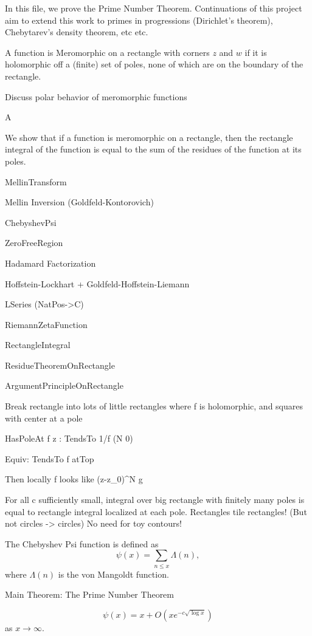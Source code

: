 

In this file, we prove the Prime Number Theorem. Continuations of this project aim to extend
this work to primes in progressions (Dirichlet's theorem), Chebytarev's density theorem, etc
etc.




A function is Meromorphic on a rectangle with corners $z$ and $w$ if it is holomorphic off a
(finite) set of poles, none of which are on the boundary of the rectangle.



Discuss polar behavior of meromorphic functions

A




We show that if a function is meromorphic on a rectangle, then the rectangle integral of the
function is equal to the sum of the residues of the function at its poles.



MellinTransform

Mellin Inversion (Goldfeld-Kontorovich)

ChebyshevPsi

ZeroFreeRegion

Hadamard Factorization

Hoffstein-Lockhart + Goldfeld-Hoffstein-Liemann

LSeries (NatPos->C)

RiemannZetaFunction

RectangleIntegral

ResidueTheoremOnRectangle

ArgumentPrincipleOnRectangle

Break rectangle into lots of little rectangles where f is holomorphic, and squares with center at a pole

HasPoleAt f z : TendsTo 1/f (N 0)

Equiv: TendsTo f atTop

Then locally f looks like (z-z_0)^N g

For all c sufficiently small, integral over big rectangle with finitely many poles is equal to rectangle integral localized at each pole.
Rectangles tile rectangles! (But not circles -> circles) No need for toy contours!




\begin{definition}
The Chebyshev Psi function is defined as
$$
\psi(x) = \sum_{n \leq x} \Lambda(n),
$$
where $\Lambda(n)$ is the von Mangoldt function.
\end{definition}




Main Theorem: The Prime Number Theorem
\begin{theorem}[PrimeNumberTheorem]
$$
ψ (x) = x + O(x e^{-c \sqrt{\log x}})
$$
as $x\to \infty$.
\end{theorem}


